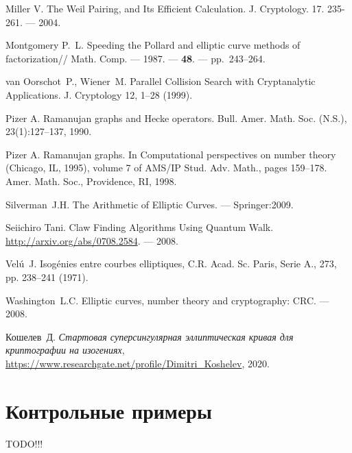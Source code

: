 \documentclass[a4paper,12pt]{article}
\theoremstyle{definition}
\begin{document}
\begin{thebibliography}{1}
 

 Miller V.  The Weil Pairing, and Its Efficient Calculation. J. Cryptology. 17. 235-261. --- 2004. 


Montgomery P.~L.
\newblock
\newblock Speeding the {P}ollard and elliptic curve methods of factorization//
  Math. Comp.
\newblock --- 1987. --- {\bf 48}. --- pp.~243--264.


 van Oorschot~P., Wiener~M. Parallel Collision Search with Cryptanalytic Applications. J. Cryptology 12, 1–28 (1999).

 Pizer A. Ramanujan graphs and Hecke operators. Bull. Amer. Math. Soc. (N.S.), 23(1):127–137, 1990.

  Pizer A. Ramanujan graphs. In Computational perspectives on number theory (Chicago, IL, 1995), volume 7 of
AMS/IP Stud. Adv. Math., pages 159–178. Amer. Math. Soc., Providence, RI, 1998.



Silverman~J.H.
\newblock The Arithmetic of Elliptic Curves. 
--- Springer:2009.



  Seiichiro Tani. 
  \newblock Claw Finding Algorithms Using Quantum Walk. \url{http://arxiv.org/abs/0708.2584}. --- 2008.
  
  
   Vel\'{u}~J. \newblock Isog\'{e}nies entre courbes elliptiques, C.R. Acad. Sc. Paris, Serie A., 273, pp. 238–241 (1971).

Washington~L.C.
\newblock Elliptic curves, number theory and cryptography: CRC.
\newblock --- 2008.


 Кошелев~Д. {\it Стартовая суперсингулярная эллиптическая кривая для криптографии на изогениях}, \url{https://www.researchgate.net/profile/Dimitri_Koshelev}, 2020.

\end{thebibliography}

\newpage 

\appendix
\section{Контрольные примеры}

TODO!!!
\end{document}
